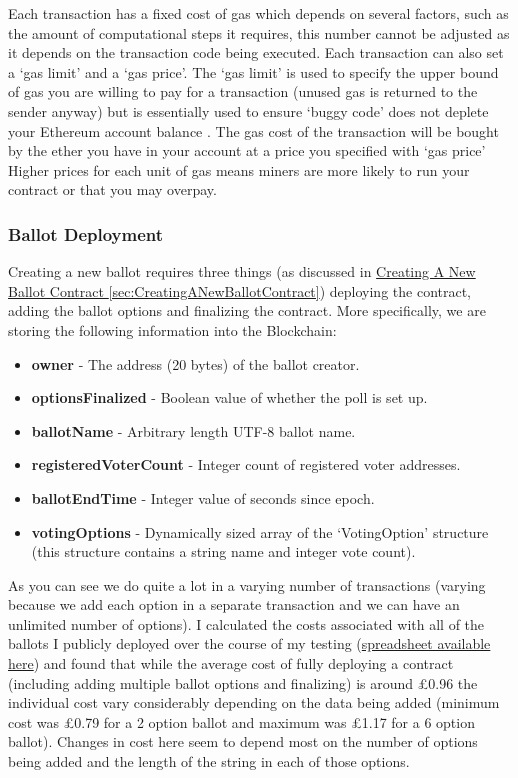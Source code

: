 \documentclass{article}
\begin{document}
	Each transaction has a fixed cost of gas which depends on several factors, such as the amount of computational steps it requires, this number cannot be adjusted as it depends on the transaction code being executed. Each transaction can also set a `gas limit' and a `gas price'. The `gas limit' is used to specify the upper bound of gas you are willing to pay for a transaction (unused gas is returned to the sender anyway) but is essentially used to ensure `buggy code' does not deplete your Ethereum account balance \citep{57_introduction_ethereum_frontier_guide_2017}. The gas cost of the transaction will be bought by the ether you have in your account at a price you specified with `gas price' Higher prices for each unit of gas means miners are more likely to run your contract or that you may overpay. 
	
	\subsubsection{Ballot Deployment}
	Creating a new ballot requires three things (as discussed in \hyperref[sec:CreatingANewBallotContract]{Creating A New Ballot Contract \ref*{sec:CreatingANewBallotContract}}) deploying the contract, adding the ballot options and finalizing the contract. More specifically, we are storing the following information into the Blockchain:
	\begin{itemize}
		\item \textbf{owner} - The address (20 bytes) of the ballot creator.
		\item \textbf{optionsFinalized} - Boolean value of whether the poll is set up.
		\item \textbf{ballotName} - Arbitrary length UTF-8 ballot name.
		\item \textbf{registeredVoterCount} - Integer count of registered voter addresses.
		\item \textbf{ballotEndTime} - Integer value of seconds since epoch.
		\item \textbf{votingOptions} - Dynamically sized array of the `VotingOption' structure (this structure contains a string name and integer vote count).
	\end{itemize}
	
	As you can see we do quite a lot in a varying number of transactions (varying because we add each option in a separate transaction and we can have an unlimited number of options). I calculated the costs associated with all of the ballots I publicly deployed over the course of my testing (\href{https://docs.google.com/spreadsheets/d/1dyLkpD-rdH4eHFEsdPrLEXX45YHl9XLGppbYgYYsTOo/edit?usp=sharing}{spreadsheet available here}) and found that while the average cost of fully deploying a contract (including adding multiple ballot options and finalizing) is around \pounds0.96 the individual cost vary considerably depending on the data being added (minimum cost was \pounds0.79 for a 2 option ballot and maximum was \pounds1.17 for a 6 option ballot). Changes in cost here seem to depend most on the number of options being added and the length of the string in each of those options.
	
\end{document}
